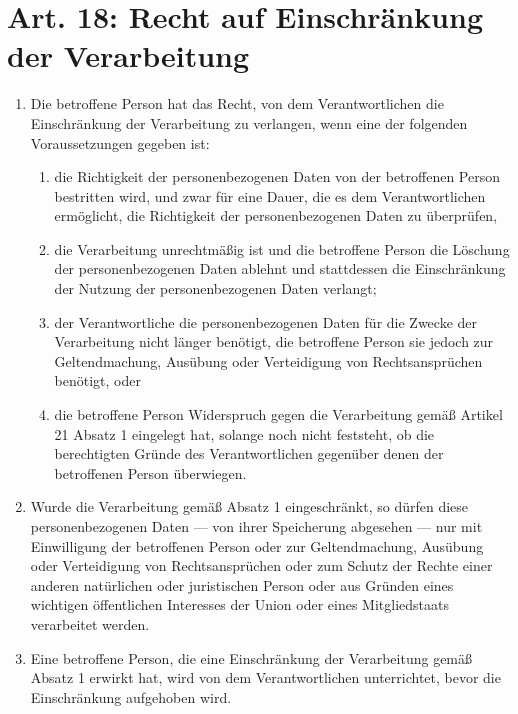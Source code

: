     \section{Art. 18: Recht auf Einschränkung der Verarbeitung}
        \begin{enumerate}[label=(\arabic*)]
            \item Die betroffene Person hat das Recht, von dem Verantwortlichen die Einschränkung der Verarbeitung zu verlangen, wenn eine der folgenden Voraussetzungen gegeben ist:
                \begin{enumerate}[label=\alph*)]
                    \item die Richtigkeit der personenbezogenen Daten von der betroffenen Person bestritten wird, und zwar für eine Dauer, die es dem Verantwortlichen ermöglicht, die Richtigkeit der personenbezogenen Daten zu überprüfen,
                    \item die Verarbeitung unrechtmäßig ist und die betroffene Person die Löschung der personenbezogenen Daten ablehnt und stattdessen die Einschränkung der Nutzung der personenbezogenen Daten verlangt; 
                    \item der Verantwortliche die personenbezogenen Daten für die Zwecke der Verarbeitung nicht länger benötigt, die betroffene Person sie jedoch zur Geltendmachung, Ausübung oder Verteidigung von Rechtsansprüchen benötigt, oder
                    \item die betroffene Person Widerspruch gegen die Verarbeitung gemäß Artikel 21 Absatz 1 eingelegt hat, solange noch nicht feststeht, ob die berechtigten Gründe des Verantwortlichen gegenüber denen der betroffenen Person überwiegen.
                \end{enumerate}
            \item Wurde die Verarbeitung gemäß Absatz 1 eingeschränkt, so dürfen diese personenbezogenen Daten — von ihrer Speicherung abgesehen — nur mit Einwilligung der betroffenen Person oder zur Geltendmachung, Ausübung oder Verteidigung von Rechtsansprüchen oder zum Schutz der Rechte einer anderen natürlichen oder juristischen Person oder aus Gründen eines wichtigen öffentlichen Interesses der Union oder eines Mitgliedstaats verarbeitet werden.
            \item Eine betroffene Person, die eine Einschränkung der Verarbeitung gemäß Absatz 1 erwirkt hat, wird von dem Verantwortlichen unterrichtet, bevor die Einschränkung aufgehoben wird. 
        \end{enumerate}

